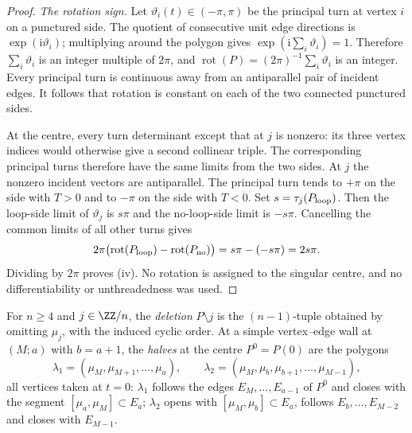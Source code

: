 \begin{proof}
\emph{The rotation sign.}
Let $\vartheta_i(t)\in(-\pi,\pi)$ be the principal turn at vertex $i$
on a punctured side. The quotient of consecutive unit edge directions
is $\exp(\mathrm i\vartheta_i)$; multiplying around the polygon gives
$\exp(\mathrm i\sum_i\vartheta_i)=1$. Therefore
$\sum_i\vartheta_i$ is an integer multiple of $2\pi$, and
$\operatorname{rot}(P)=(2\pi)^{-1}\sum_i\vartheta_i$ is an integer.
Every principal turn is continuous away from an antiparallel pair of
incident edges. It follows that rotation is constant on each of the two
connected punctured sides.

At the centre, every turn determinant except that at $j$ is nonzero:
its three vertex indices would otherwise give a second collinear triple.
The corresponding principal turns therefore have the same limits from
the two sides. At $j$ the nonzero incident vectors are antiparallel.
The principal turn tends to $+\pi$ on the side with $T>0$ and to
$-\pi$ on the side with $T<0$. Set $s=\tau_j(P_{\rm loop})$.
Then the loop-side limit of $\vartheta_j$ is $s\pi$ and the no-loop-side
limit is $-s\pi$. Cancelling the common limits of all other turns gives
\begin{equation}\label{cusppr:rotation-limits}
2\pi\bigl(\operatorname{rot}(P_{\rm loop})-
                 \operatorname{rot}(P_{\rm no})\bigr)
=s\pi-(-s\pi)=2s\pi.
\end{equation}
Dividing by $2\pi$ proves (iv). No rotation is assigned to the singular
centre, and no differentiability or unthreadedness was used.
\end{proof}

\begin{definition}\label{def:deletion-halves}\leanok
For $n\geq4$ and $j\in\ZZ/n$, the \emph{deletion} $P\setminus j$ is the
$(n-1)$-tuple obtained by omitting $\mu_j$, with the induced cyclic order.
At a simple vertex--edge wall at $(M;a)$ with $b=a+1$, the \emph{halves} at
the centre $P^0=P(0)$ are the polygons
\[
\lambda_1=(\mu_M,\mu_{M+1},\ldots,\mu_a),\qquad
\lambda_2=(\mu_M,\mu_b,\mu_{b+1},\ldots,\mu_{M-1}),
\]
all vertices taken at $t=0$: $\lambda_1$ follows the edges $E_M,\ldots,E_{a-1}$
of $P^0$ and closes with the segment $[\mu_a,\mu_M]\subset E_a$; $\lambda_2$
opens with $[\mu_M,\mu_b]\subset E_a$, follows $E_b,\ldots,E_{M-2}$ and closes
with $E_{M-1}$.
\end{definition}

